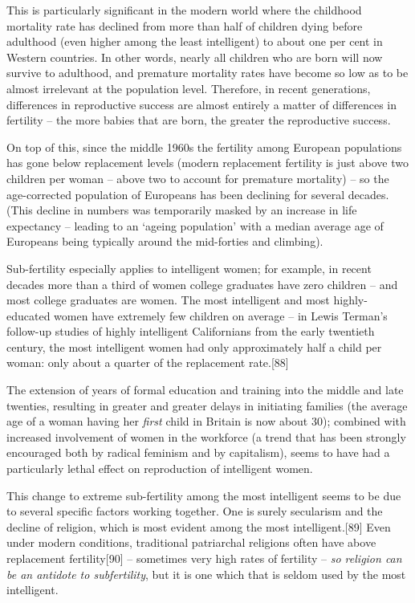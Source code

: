 \documentclass[
]{book}
\begin{document}
This is particularly significant in the modern world where the childhood mortality rate has declined from more than half of children dying before adulthood (even higher among the least intelligent) to about one per cent in Western countries. In other words, nearly all children who are born will now survive to adulthood, and premature mortality rates have become so low as to be almost irrelevant at the population level. Therefore, in recent generations, differences in reproductive success are almost entirely a matter of differences in fertility -- the more babies that are born, the greater the reproductive success.

On top of this, since the middle 1960s the fertility among European populations has gone below replacement levels (modern replacement fertility is just above two children per woman -- above two to account for premature mortality) -- so the age-corrected population of Europeans has been declining for several decades. (This decline in numbers was temporarily masked by an increase in life expectancy -- leading to an `ageing population' with a median average age of Europeans being typically around the mid-forties and climbing).

Sub-fertility especially applies to intelligent women; for example, in recent decades more than a third of women college graduates have zero children -- and most college graduates are women. The most intelligent and most highly-educated women have extremely few children on average -- in Lewis Terman's follow-up studies of highly intelligent Californians from the early twentieth century, the most intelligent women had only approximately half a child per woman: only about a quarter of the replacement rate.{[}88{]}

The extension of years of formal education and training into the middle and late twenties, resulting in greater and greater delays in initiating families (the average age of a woman having her \emph{first} child in Britain is now about 30); combined with increased involvement of women in the workforce (a trend that has been strongly encouraged both by radical feminism and by capitalism), seems to have had a particularly lethal effect on reproduction of intelligent women.

This change to extreme sub-fertility among the most intelligent seems to be due to several specific factors working together. One is surely secularism and the decline of religion, which is most evident among the most intelligent.{[}89{]} Even under modern conditions, traditional patriarchal religions often have above replacement fertility{[}90{]} -- sometimes very high rates of fertility -- \emph{so religion can be an antidote to subfertility}, but it is one which that is seldom used by the most intelligent.
\end{document}
